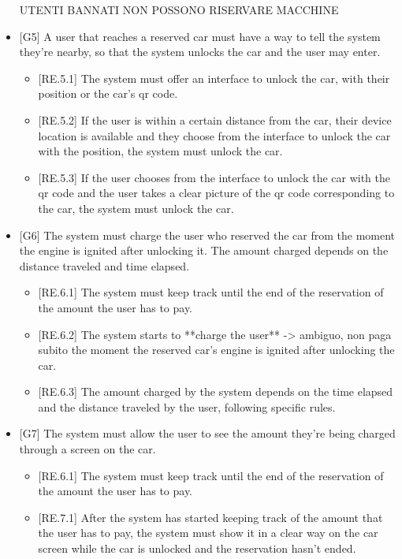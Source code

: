 \documentclass[english]{article}
\begin{document}
\begin{itemize}
{\begin{itemize}
UTENTI BANNATI NON POSSONO RISERVARE MACCHINE

\end{itemize}
}

\item{[G5] A user that reaches a reserved car must have a way to tell the system they’re nearby, so that the system unlocks the car and the user may enter.
\begin{itemize}
	\item{[RE.5.1] The system must offer an interface to unlock the car, with their position or the car's qr code.}
	\item{[RE.5.2] If the user is within a certain distance from the car, their device location is available and they choose from the interface to unlock the car with the position, the system must unlock the car.}
	\item{[RE.5.3] If the user chooses from the interface to unlock the car with the qr code and the user takes a clear picture of the qr code corresponding to the car, the system must unlock the car.}
\end{itemize}
}

\item{[G6] The system must charge the user who reserved the car from the moment the engine is ignited after unlocking it. The amount charged depends on the distance traveled and time elapsed.
\begin{itemize}
	\item{[RE.6.1] The system must keep track until the end of the reservation of the amount the user has to pay.}
	\item{[RE.6.2] The system starts to **charge the user** -> ambiguo, non paga subito  the moment the reserved car’s engine is ignited after unlocking the car.}
	\item{[RE.6.3] The amount charged by the system depends on the time elapsed and the distance traveled by the user, following specific rules.}
\end{itemize}
}

\item{[G7] The system must allow the user to see the amount they’re being charged through a screen on the car.
\begin{itemize}
	\item{[RE.6.1] The system must keep track until the end of the reservation of the amount the user has to pay.}
	\item{[RE.7.1] After the system has started keeping track of the amount that the user has to pay, the system must show it in a clear way on the car screen while the car is unlocked and the reservation hasn’t ended.}
\end{itemize}
}


\end{itemize}
\end{document}
